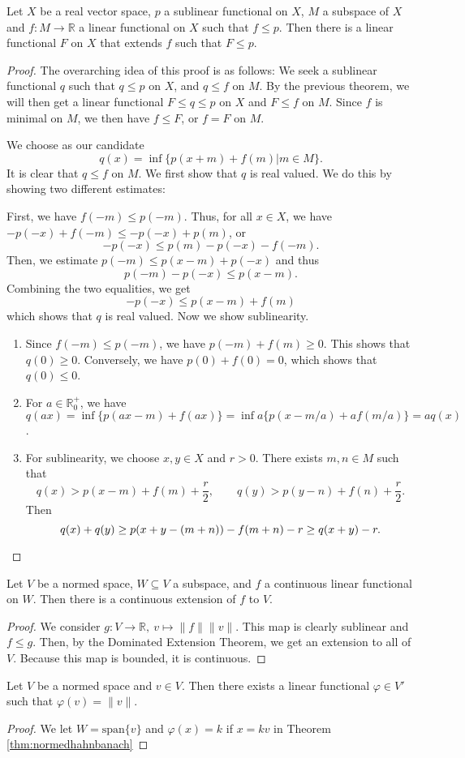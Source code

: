 \documentclass[prb,12pt]{revtex4-2}
\theoremstyle{definition}
\theoremstyle{definition}
\theoremstyle{definition}
\newcommand{\R}{\mathbb{R}}
\begin{document}
	\begin{Theorem}
	Let $X$ be a real vector space, $p$ a sublinear functional on $X$, $M$ a subspace of $X$ and $f:M \to \R$ a linear functional on $X$ such that $f \le p$. Then there is a linear functional $F$ on $X$ that extends $f$ such that $F \le p$.
	\end{Theorem}
	\begin{proof}
	The overarching idea of this proof is as follows: We seek a sublinear functional $q$ such that $q\le p$ on $X$, and $q \le f$ on $M$. By the previous theorem, we will then get a linear functional $F \le q \le p$ on $X$ and $F \le f$ on $M$. Since $f$ is minimal on $M$, we then have $f \le F$, or $f=F$ on $M$.
	
	We choose as our candidate
	\[
	q(x)=\inf \{p(x+m)+f(m)|m \in M \} 
	.\] 
	It is clear that $q\le f$ on $M$. We first show that $q$ is real valued. We do this by showing two different estimates:
	
	First, we have $f(-m)\le p(-m)$. Thus, for all $x\in X$, we have $-p(-x)+f(-m)\le -p(-x)+p(m)$, or
	\[
	-p(-x)\le p(m)-p(-x)-f(-m)
	.\] 
	Then, we estimate $p(-m)\le p(x-m) + p(-x)$ and thus
	\[p(-m)-p(-x)\le p(x-m).\]
	Combining the two equalities, we get
	\[
	-p(-x)\le p(x-m)+f(m)
	\]
	which shows that $q$ is real valued. Now we show sublinearity.
	\begin{enumerate}
		\item Since $f(-m) \le p(-m)$, we have $p(-m)+f(m)\ge 0$. This shows that $q(0)\ge 0$. Conversely, we have $p(0)+f(0)=0$, which shows that $q(0)\le 0$. 
		\item For $a\in \R_0^+$, we have $q(ax)=\inf \{p(ax-m)+f(ax)\} =\inf a\{p(x - m / a)+a f(m / a)\} = aq(x)$.
		\item For sublinearity, we choose $x,y\in X$ and $r>0$. There exists $m,n\in M$ such that
			\[
			q(x)>p(x-m)+f(m)+\frac{r}{2},\qquad q(y)>p(y-n)+f(n)+\frac{r}{2}
			.\] 
			Then
			\[
			q(x)+q(y)\ge p(x+y-(m+n)) - f(m+n) - r\ge q(x+y)-r
			.\qedhere\] 
	\end{enumerate}
	\end{proof}
	\begin{Theorem}\label{thm:normedhahnbanach}
		Let $V$ be a normed space, $W\subseteq V$ a subspace, and $f$ a continuous linear functional on $W$. Then there is a continuous extension of $f$ to $V$.
\end{Theorem}
\begin{proof}
	We consider $g: V \to \R,~v\mapsto \|f\| \|v\|$. This map is clearly sublinear and $f \le g$. Then, by the Dominated Extension Theorem, we get an extension to all of $V$. Because this map is bounded, it is continuous.
\end{proof}
\begin{Corollary}\label{cor:hahnbanachsubspace}
	Let $ V$ be a normed space and $v\in V$. Then there exists a linear functional $\varphi \in V'$ such that $\varphi(v)=\|v\|$.
\end{Corollary}
\begin{proof}
	We let $W=\text{span}\{v\} $ and $\varphi(x)=k$ if $x=kv$ in Theorem \ref{thm:normedhahnbanach}
\end{proof}
\end{document}
